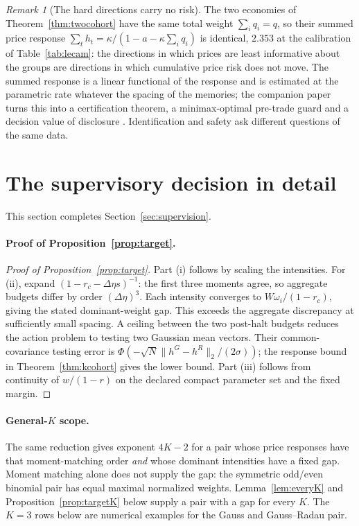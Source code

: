 \documentclass[12pt]{article}
\theoremstyle{definition}
\theoremstyle{remark}
\newtheorem{remark}[theorem]{Remark}
\begin{document}
\begin{remark}[The hard directions carry no risk]\label{rem:riskneutral}
The two economies of Theorem~\ref{thm:twocohort} have the same total weight $\sum_iq_i=q$, so their summed price response $\sum_th_t=\kappa/(1-a-\kappa\sum_iq_i)$ is identical, $2.353$ at the calibration of Table~\ref{tab:lecam}: the directions in which prices are least informative about the groups are directions in which cumulative price risk does not move. The summed response is a linear functional of the response and is estimated at the parametric rate whatever the spacing of the memories; the companion paper turns this into a certification theorem, a minimax-optimal pre-trade guard and a decision value of disclosure \citep{niroula2026b}. Identification and safety ask different questions of the same data.
\end{remark}

\section{The supervisory decision in detail}\label{app:decisionfull}
This section completes Section~\ref{sec:supervision}.

\paragraph{Proof of Proposition~\ref{prop:target}.}
\begin{proof}[Proof of Proposition~\ref{prop:target}]
Part (i) follows by scaling the intensities. For (ii), expand $(1-r_c-\Delta\eta s)^{-1}$: the first three moments agree, so aggregate budgets differ by order $(\Delta\eta)^3$. Each intensity converges to $W\omega_i/(1-r_c)$, giving the stated dominant-weight gap. This exceeds the aggregate discrepancy at sufficiently small spacing. A ceiling between the two post-halt budgets reduces the action problem to testing two Gaussian mean vectors. Their common-covariance testing error is $\Phi(-\sqrt N\|h^G-h^R\|_2/(2\sigma))$; the response bound in Theorem~\ref{thm:kcohort} gives the lower bound. Part (iii) follows from continuity of $w/(1-r)$ on the declared compact parameter set and the fixed margin.
\end{proof}

\paragraph{General-$K$ scope.} The same reduction gives exponent $4K-2$ for a pair whose price responses have that moment-matching order \emph{and} whose dominant intensities have a fixed gap. Moment matching alone does not supply the gap: the symmetric odd/even binomial pair has equal maximal normalized weights. Lemma~\ref{lem:everyK} and Proposition~\ref{prop:targetK} below supply a pair with a gap for every $K$. The $K=3$ rows below are numerical examples for the Gauss and Gauss--Radau pair.
\end{document}
